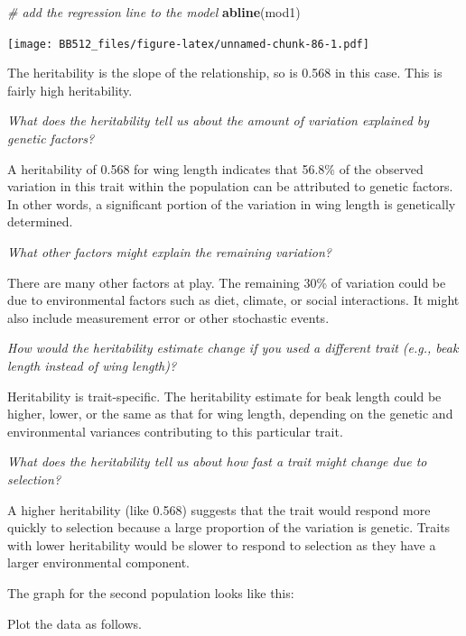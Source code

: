 \documentclass[
  a4paper]{book}
\newenvironment{Shaded}{\begin{snugshade}}{\end{snugshade}}
\newcommand{\AttributeTok}[1]{\textcolor[rgb]{0.13,0.29,0.53}{#1}}
\newcommand{\CommentTok}[1]{\textcolor[rgb]{0.56,0.35,0.01}{\textit{#1}}}
\newcommand{\FunctionTok}[1]{\textcolor[rgb]{0.13,0.29,0.53}{\textbf{#1}}}
\newcommand{\NormalTok}[1]{#1}
\newcommand{\OtherTok}[1]{\textcolor[rgb]{0.56,0.35,0.01}{#1}}
\newcommand{\SpecialCharTok}[1]{\textcolor[rgb]{0.81,0.36,0.00}{\textbf{#1}}}
\newcommand{\StringTok}[1]{\textcolor[rgb]{0.31,0.60,0.02}{#1}}
\begin{document}
\begin{Shaded}
\begin{Highlighting}[]
\CommentTok{\# add the regression line to the model}
\FunctionTok{abline}\NormalTok{(mod1)}
\end{Highlighting}
\end{Shaded}

\texttt{[image: BB512\_files/figure-latex/unnamed-chunk-86-1.pdf]}

The heritability is the slope of the relationship, so is 0.568 in this case. This is fairly high heritability.

\emph{What does the heritability tell us about the amount of variation explained by genetic factors?}

A heritability of 0.568 for wing length indicates that 56.8\% of the observed variation in this trait within the population can be attributed to genetic factors. In other words, a significant portion of the variation in wing length is genetically determined.

\emph{What other factors might explain the remaining variation?}

There are many other factors at play. The remaining 30\% of variation could be due to environmental factors such as diet, climate, or social interactions. It might also include measurement error or other stochastic events.

\emph{How would the heritability estimate change if you used a different trait (e.g., beak length instead of wing length)?}

Heritability is trait-specific. The heritability estimate for beak length could be higher, lower, or the same as that for wing length, depending on the genetic and environmental variances contributing to this particular trait.

\emph{What does the heritability tell us about how fast a trait might change due to selection?}

A higher heritability (like 0.568) suggests that the trait would respond more quickly to selection because a large proportion of the variation is genetic. Traits with lower heritability would be slower to respond to selection as they have a larger environmental component.

The graph for the second population looks like this:

Plot the data as follows.

\begin{Shaded}
\end{Shaded}
\end{document}
